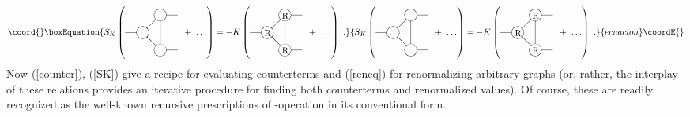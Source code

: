 \documentclass[a4paper,12pt]{article}
\begin{document}
\begin{equation}\coord{}\boxEquation{
\label{SK}
S_K\left(
\parbox{2.3cm}{
\begin{picture}(60,60)
\put(20,30){\circle{14}}
\put(40,10){\circle{14}}
\put(40,50){\circle{14}}
\put(0,30){\line(1,0){13}}
\put(47,50){\line(1,0){13}}
\put(47,10){\line(1,0){13}}
\put(25,35){\line(1,1){10}}
\put(25,25){\line(1,-1){10}}
\put(40,17){\line(0,1){26.5}}
\end{picture}
} + \ \ldots \right) = - K\left(
\parbox{2.3cm}{
\begin{picture}(60,60)
\put(20,30){\circle{14}}
\put(40,10){\circle{14}}
\put(40,50){\circle{14}}
\put(0,30){\line(1,0){13}}
\put(47,50){\line(1,0){13}}
\put(47,10){\line(1,0){13}}
\put(25,35){\line(1,1){10}}
\put(25,25){\line(1,-1){10}}
\put(40,17){\line(0,1){26.5}}
\put(16.7,26){R}
\put(36.7,6){R}
\put(36.7,46){R}
\end{picture}
} + \ \ldots \right)\ .
}{
S_K\left(
\parbox{2.3cm}{
\begin{picture}(60,60)
\put(20,30){\circle{14}}
\put(40,10){\circle{14}}
\put(40,50){\circle{14}}
\put(0,30){\line(1,0){13}}
\put(47,50){\line(1,0){13}}
\put(47,10){\line(1,0){13}}
\put(25,35){\line(1,1){10}}
\put(25,25){\line(1,-1){10}}
\put(40,17){\line(0,1){26.5}}
\end{picture}
} + \ \ldots \right) = - K\left(
\parbox{2.3cm}{
\begin{picture}(60,60)
\put(20,30){\circle{14}}
\put(40,10){\circle{14}}
\put(40,50){\circle{14}}
\put(0,30){\line(1,0){13}}
\put(47,50){\line(1,0){13}}
\put(47,10){\line(1,0){13}}
\put(25,35){\line(1,1){10}}
\put(25,25){\line(1,-1){10}}
\put(40,17){\line(0,1){26.5}}
\put(16.7,26){R}
\put(36.7,6){R}
\put(36.7,46){R}
\end{picture}
} + \ \ldots \right)\ .
}{ecuacion}\coordE{}\end{equation}
Now (\ref{counter}), (\ref{SK}) give a recipe for evaluating counterterms
and (\ref{reneq}) for renormalizing arbitrary graphs
(or, rather, the interplay of these relations provides an iterative
procedure for finding both counterterms and renormalized values).
Of course, these are readily recognized as the well-known recursive
prescriptions of \coordHE{}-operation in its conventional form.
\end{document}
